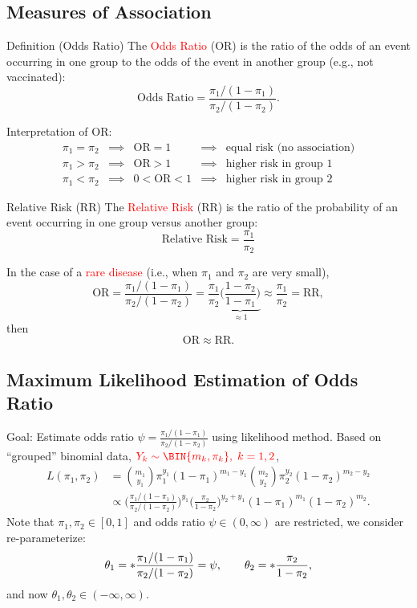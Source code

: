 \documentclass{article}\usepackage[]{graphicx}\usepackage[svgnames]{xcolor}
\let\log\relax%
\newcommand{\OR}{\text{OR}}%
\newcommand{\RR}{\text{RR}}%
\begin{document}
\subsection*{Measures of Association}
\begin{Regular}{Definition (Odds Ratio)}
    The \textcolor{Red}{Odds Ratio} (OR) is the ratio of the odds of an event occurring in one
    group to the odds of the event in another group (e.g., not vaccinated):
    \[ \text{Odds Ratio}=\frac{\pi_1/(1-\pi_1)}{\pi_2/(1-\pi_2)}. \]
\end{Regular}
Interpretation of OR:
\[ \begin{array}{ccccc}
        \pi_1=\pi_2 & \implies & \OR=1   & \implies & \text{equal risk (no association)} \\
        \pi_1>\pi_2 & \implies & \OR>1   & \implies & \text{higher risk in group 1}      \\
        \pi_1<\pi_2 & \implies & 0<\OR<1 & \implies & \text{higher risk in group 2}
    \end{array} \]
\begin{Regular}{Relative Risk (RR)}
    The \textcolor{Red}{Relative Risk} (RR) is the ratio of the probability of an event occurring in one group versus another group:
    \[ \text{Relative Risk}=\frac{\pi_1}{\pi_2} \]
\end{Regular}
In the case of a \textcolor{Red}{rare disease} (i.e., when $ \pi_1 $ and $ \pi_2 $ are very small),
\[ \OR=\frac{\pi_1/(1-\pi_1)}{\pi_2/(1-\pi_2)}=\frac{\pi_1}{\pi_2}\underbrace{\biggl(\frac{1-\pi_2}{1-\pi_1}\biggr)}_{\approx 1}\approx \frac{\pi_1}{\pi_2} =\RR,  \]
then
\[ \OR\approx\RR. \]
\subsection*{Maximum Likelihood Estimation of Odds Ratio}
Goal: Estimate odds ratio $ \psi=\frac{\pi_1/(1-\pi_1)}{\pi_2/(1-\pi_2)} $ using likelihood method. Based
on ``grouped'' binomial data, $ \textcolor{Red}{Y_k \sim \BIN{m_k,\pi_k},\; k=1,2} $,
\begin{align*}
    L(\pi_1,\pi_2)
     & =\binom{m_1}{y_1}\pi_1^{y_1}(1-\pi_1)^{m_1-y_1}\binom{m_2}{y_2}\pi_2^{y_2}(1-\pi_2)^{m_2-y_2}                                                        \\
     & \propto\biggl(\frac{\pi_1/(1-\pi_1)}{\pi_2/(1-\pi_2)} \biggr)^{\!y_1}\biggl(\frac{\pi_2}{1-\pi_2}\biggr)^{\! y_2+y_1}(1-\pi_1)^{m_1}(1-\pi_2)^{m_2}.
\end{align*}
Note that $ \pi_1,\pi_2\in[0,1] $ and odds ratio $ \psi\in(0,\infty) $ are restricted, we consider re-parameterize:
\[ \theta_1=\log*{\frac{\pi_1/(1-\pi_1)}{\pi_2/(1-\pi_2)}}=\log{\psi},\qquad \theta_2=\log*{\frac{\pi_2}{1-\pi_2}}, \]
and now $ \theta_1,\theta_2\in(-\infty,\infty) $.
\end{document}
